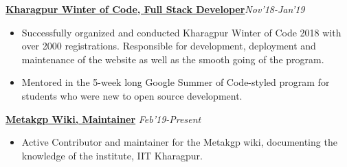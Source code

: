 \documentclass[a4paper,10pt]{extarticle} %
\begin{document}
\textbf{\href{https://github.com/kossiitkgp/kwoc-2018}{Kharagpur Winter of Code, Full Stack Developer}}\hfill\textit{\small{Nov'18-Jan'19}}
    \begin{itemize}[leftmargin=.15in]
        \item Successfully organized and conducted Kharagpur Winter of Code 2018 with over 2000 registrations. Responsible for development, deployment and maintenance of the website as well as the smooth going of the program.
        \item Mentored in the 5-week long Google Summer of Code-styled program for students who were new to open source development.
    \end{itemize}

\textbf{\href{https://wiki.metakgp.org}{Metakgp Wiki, Maintainer}} \hfill\textit{\small{Feb'19-Present}}
    \begin{itemize}[leftmargin=.15in]
        \item Active Contributor and maintainer for the Metakgp wiki, documenting the knowledge of the institute, IIT Kharagpur.
    \end{itemize}
\end{document}

